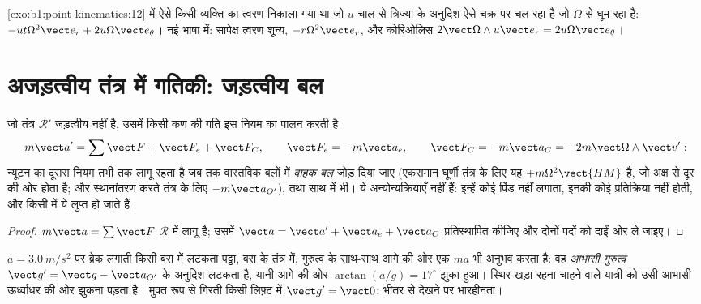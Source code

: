 \begin{example}[घूमते चक्र पर चलना]\label{ex:b1:non-inertial-frames:turntable}
\cref{exo:b1:point-kinematics:12} में ऐसे किसी व्यक्ति का त्वरण निकाला गया
था जो $u$ चाल से त्रिज्या के अनुदिश ऐसे चक्र पर चल रहा है जो $\Omega$ से
घूम रहा है: $-ut\Omega^2\vect e_r
+ 2u\Omega\vect e_\theta$। नई भाषा में: सापेक्ष त्वरण शून्य, 
$-r\Omega^2\vect e_r$, और कोरिओलिस $2\vect\Omega\wedge u\vect e_r = 2u\Omega\vect e_\theta$।
\end{example}

\section{अजड़त्वीय तंत्र में गतिकी: जड़त्वीय बल}

\begin{theorem}[अजड़त्वीय तंत्र में न्यूटन का नियम]\label{thm:b1:non-inertial-frames:dynamics}
जो तंत्र $\mathcal R'$ जड़त्वीय नहीं है, उसमें किसी कण की गति इस नियम का
पालन करती है
\[
m\vect a' = \sum\vect F + \vect F_e + \vect F_C, \qquad
\vect F_e = -m\vect a_e, \qquad \vect F_C = -m\vect a_C = -2m\vect\Omega\wedge\vect v' :
\]
न्यूटन का दूसरा नियम तभी तक लागू रहता है जब तक वास्तविक बलों में
\emph{वाहक बल} जोड़ दिया जाए (एकसमान घूर्णी तंत्र के लिए यह
\emph{} $+m\Omega^2\vect{HM}$ है, जो अक्ष से दूर की ओर होता है;
और स्थानांतरण करते तंत्र के लिए $-m\vect a_{O'}$), तथा साथ में
\emph{} भी। ये \emph{} अन्योन्यक्रियाएँ नहीं हैं:
इन्हें कोई पिंड नहीं लगाता, इनकी कोई प्रतिक्रिया नहीं होती, और किसी
 में ये लुप्त हो जाते हैं।
\end{theorem}

\begin{proof}
$m\vect a = \sum\vect F$  $\mathcal R$ में लागू है; उसमें
$\vect a = \vect a' + \vect a_e + \vect a_C$ प्रतिस्थापित कीजिए और दोनों
पदों को दाईं ओर ले जाइए।
\end{proof}

\begin{example}[झुकता यात्री, साहुल]\label{ex:b1:non-inertial-frames:bus}
$a = \qty{3.0}{m/s^2}$ पर ब्रेक लगाती किसी बस में लटकता पट्टा, बस के तंत्र
में, गुरुत्व के साथ-साथ आगे की ओर एक  $ma$ भी अनुभव करता है: वह
\emph{आभासी गुरुत्व} $\vect g' = \vect g - \vect a_{O'}$ के अनुदिश लटकता
है, यानी आगे की ओर $\arctan(a/g) = 17^\circ$ झुका हुआ। स्थिर खड़ा रहना
चाहने वाले यात्री को उसी आभासी ऊर्ध्वाधर की ओर झुकना पड़ता है। मुक्त रूप
से गिरती किसी लिफ़्ट में $\vect g' = \vect 0$: भीतर से देखने पर भारहीनता।
\end{example}


